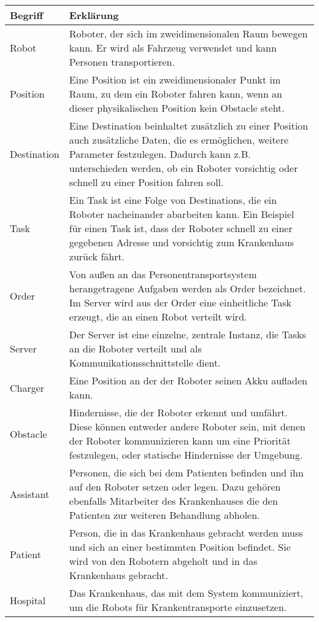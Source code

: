 	\begin{tabularx}{\textwidth}{|l|X|}
		\hline
		\textbf{Begriff} & \textbf{Erklärung}\\ \hline
		Robot & Roboter, der sich im zweidimensionalen Raum bewegen kann. Er wird als Fahrzeug verwendet und kann Personen transportieren.\\ \hline
		Position & Eine Position ist ein zweidimensionaler Punkt im Raum, zu dem ein Roboter fahren kann, wenn an dieser physikalischen Position kein Obstacle steht.\\ \hline
		Destination & Eine Destination beinhaltet zusätzlich zu einer Position auch zusätzliche Daten, die es ermöglichen, weitere Parameter festzulegen. 
		Dadurch kann z.B. unterschieden werden, ob ein Roboter vorsichtig oder schnell zu einer Position fahren soll. \\ \hline
		Task & Ein Task ist eine Folge von Destinations, die ein Roboter nacheinander abarbeiten kann. Ein Beispiel für einen Task ist, dass der Roboter schnell zu einer gegebenen Adresse und vorsichtig zum Krankenhaus zurück fährt.\\ \hline
		Order & Von außen an das Personentransportsystem herangetragene Aufgaben werden als Order bezeichnet. Im Server wird aus der Order eine einheitliche Task erzeugt, die an einen Robot verteilt wird.\\ \hline
		Server & Der Server ist eine einzelne, zentrale Instanz, die Tasks an die Roboter verteilt und als Kommunikationsschnittstelle dient.\\ \hline
		Charger & Eine Position an der der Roboter seinen Akku aufladen kann.\\ \hline
		Obstacle & Hindernisse, die der Roboter erkennt und umfährt. Diese können
		entweder andere Roboter sein, mit denen der Roboter kommunizieren kann
		um eine Priorität festzulegen, oder statische Hindernisse der
		Umgebung.\\ \hline
		Assistant & Personen, die sich bei dem Patienten befinden und ihn auf den Roboter setzen oder legen.
		 Dazu gehören ebenfalls Mitarbeiter des Krankenhauses die den Patienten zur weiteren Behandlung abholen.\\ \hline
		Patient & Person, die in das Krankenhaus gebracht werden muss und sich an einer bestimmten Position befindet. 
		Sie wird von den Robotern abgeholt und in das Krankenhaus gebracht.\\ \hline
		Hospital & Das Krankenhaus, das mit dem System kommuniziert, um die Robots für Krankentransporte einzusetzen. \\ \hline

\end{tabularx}
